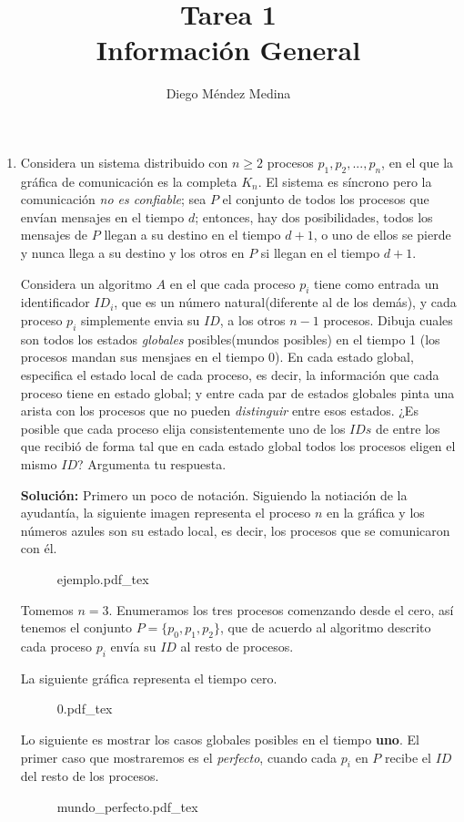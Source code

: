 \documentclass[8pt, letterpaper]{article}
\title{%
  Tarea 1\\
  {\large{Información General}}}
\author{Diego Méndez Medina}
\date{}
\begin{document}
\ttfamily
\maketitle
\rmfamily
\begin{enumerate}
\item Considera un sistema distribuido con $n \geq 2$ procesos
  $p_1, p_2, ..., p_n$, en el que la gráfica de comunicación es la completa
  $K_n$. El sistema es síncrono pero la comunicación \textit{no es confiable};
  sea $P$ el conjunto de todos los procesos que envían mensajes en el tiempo
  $d$; entonces, hay dos posibilidades, todos los mensajes de $P$ llegan a su
  destino en el tiempo $d+1$, o uno de ellos se pierde y nunca llega a su destino
  y los otros en $P$ si llegan en el tiempo $d+1$.

  Considera un algoritmo $A$ en el que cada proceso $p_i$ tiene como entrada un
  identificador $ID_i$, que es un número natural(diferente al de los demás),
  y cada proceso $p_i$ simplemente envia su $ID$, a los otros $n-1$ procesos.
  Dibuja cuales son todos los estados \textit{globales} posibles(mundos posibles) en el tiempo 1 (los procesos mandan sus mensjaes en el tiempo 0). En cada estado global, especifica el estado local de cada proceso, es decir, la información
  que cada proceso tiene en estado global; y entre cada par de estados globales pinta una arista con los procesos que no pueden \textit{distinguir} entre esos 
  estados. ¿Es posible que cada proceso elija consistentemente uno de los $IDs$
  de entre los que recibió de forma tal que en cada estado global todos los
  procesos eligen el mismo $ID$? Argumenta tu respuesta.
  \ttfamily  

  \hfill\break
  {\bf Solución:}\hfill\break
  Primero un poco de notación. Siguiendo la notiación de la ayudantía, la
  siguiente imagen representa el proceso $n$ en la gráfica y los números azules
  son su estado local, es decir, los procesos que se comunicaron con él.
  \begin{figure}[h]
    \centering
    \def\svgwidth{2cm}
    {ejemplo.pdf_tex}
  \end{figure}
  \hfill\break
  Tomemos $n=3$. Enumeramos los tres procesos comenzando desde el cero,
  así tenemos el conjunto $P=\{p_0, p_1, p_2\}$, que de acuerdo al algoritmo
  descrito cada proceso $p_i$ envía su $ID$ al resto de procesos. 

  La siguiente gráfica representa el tiempo cero.
  \begin{figure}[h]
    \centering
    \def\svgwidth{5cm}
    {0.pdf_tex}
  \end{figure}
  \hfill\break
  Lo siguiente es mostrar los casos globales posibles en el tiempo {\bf uno}.
  El primer caso que mostraremos es el \textit{perfecto}, cuando cada
  $p_i$ en $P$ recibe el $ID$ del resto de los procesos.
  \begin{figure}[h]
    \centering
    \def\svgwidth{5cm}
    {mundo_perfecto.pdf_tex}
  \end{figure}


\end{enumerate}
\end{document}
